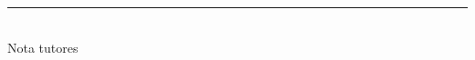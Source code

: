 %

\thispagestyle{empty}

\hfill\vfill
\noindent\rule[-1ex]{\textwidth}{2pt}\\[4.5ex]

Nota tutores

\vfill
\newpage
\endinput
